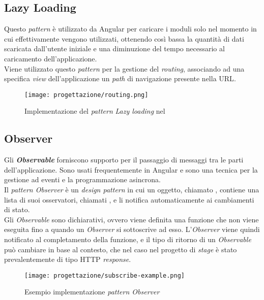 \subsection{Lazy Loading}
Questo \textit{pattern} è utilizzato da Angular per caricare i moduli solo nel momento in cui effettivamente vengono utilizzati, ottenendo così bassa la quantità di dati scaricata dall'utente iniziale e una diminuzione del tempo necessario al caricamento dell'applicazione.\\
Viene utilizzato questo \textit{pattern} per la gestione del \textit{routing}, associando ad una specifica \textit{view} dell'applicazione un \textit{path} di navigazione presente nella \gls{URL}.
\begin{figure}[H] 
    \centering 
    \texttt{[image: progettazione/routing.png]}
    \caption{Implementazione del \textit{pattern} \textit{Lazy loading} nel }
\end{figure}
\subsection{Observer}
Gli \textit{\textbf{Observable}} forniscono supporto per il passaggio di messaggi tra le parti dell'applicazione. Sono usati frequentemente in Angular e sono una tecnica per la gestione ad eventi e la programmazione asincrona.\\
Il \textit{pattern Observer} è un \textit{design pattern} in cui un oggetto, chiamato , contiene una lista di suoi osservatori, chiamati , e li notifica automaticamente ai cambiamenti di stato.\\
Gli \textit{Observable} sono dichiarativi, ovvero viene definita una funzione che non viene eseguita fino a quando un \textit{Observer} si sottoscrive ad esso. L'\textit{Observer} viene quindi notificato al completamento della funzione, e il tipo di ritorno di un \textit{Observable} può cambiare in base al contesto, che nel caso nel progetto di \textit{stage} è stato prevalentemente di tipo HTTP \textit{response}. \\
\begin{figure}[H] 
    \centering 
    \texttt{[image: progettazione/subscribe-example.png]}
    \caption{Esempio implementazione \textit{pattern Observer}}
\end{figure}
\newpage
